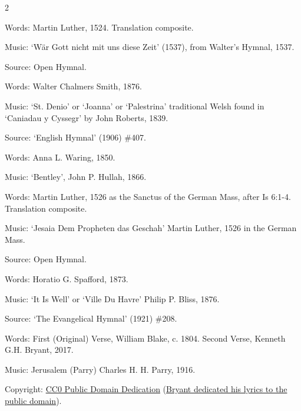 \begin{multicols}{2}
\par\noindent
Words: Martin Luther, 1524. Translation composite.
\par\noindent
Music: `Wär Gott nicht mit uns diese Zeit' (1537), from Walter's Hymnal, 1537. 
\par\noindent
Source: Open Hymnal.


\par\noindent
Words: Walter Chalmers Smith, 1876. 
\par\noindent
Music: `St. Denio' or `Joanna' or `Palestrina' traditional Welsh found in `Caniadau y Cyssegr' by John Roberts, 1839.
\par\noindent
Source: `English Hymnal' (1906) \#407.


\par\noindent
Words: Anna L. Waring, 1850.
\par\noindent
Music: `Bentley', John P. Hullah, 1866.


\newcolumn

\par\noindent
Words: Martin Luther, 1526 as the Sanctus of the German Mass, after Is 6:1-4.  Translation composite. 
\par\noindent
Music: `Jesaia Dem Propheten das Geschah' Martin Luther, 1526 in the German Mass.
\par\noindent
Source: Open Hymnal.


\par\noindent
Words: Horatio G. Spafford, 1873.
\par\noindent
Music: `It Is Well' or `Ville Du Havre' Philip P. Bliss, 1876.
\par\noindent
Source: `The Evangelical Hymnal' (1921) \#208.


\par\noindent
Words: First (Original) Verse, Will­iam Blake, c. 1804. Second Verse, Kenneth G.H. Bryant, 2017.
\par\noindent
Music: Je­ru­sa­lem (Par­ry) Charles H. H. Par­ry, 1916.
\par\noindent
Copyright: \href{https://creativecommons.org/publicdomain/zero/1.0/}{CC0 Public Domain Dedication} (\href{https://imslp.org/wiki/Jerusalem_(Parry,_Charles_Hubert_Hastings)}{Bryant dedicated his lyrics to the public domain}).



\end{multicols}
